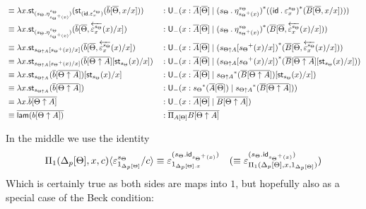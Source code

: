 \documentclass[10pt]{article}
\theoremstyle{definition}
\newcommand{\rewrite}[2]{\overleftarrow{#1}(#2)}
\newcommand\U[3]{\ensuremath{\mathsf{U}_{#1}(#2 \mid #3)}}
\newcommand\UI[2]{\ensuremath{\lambda #1.#2}}
\newcommand\St[2]{\ensuremath{{#1}^*(#2)}}
\newcommand\StI[2]{\ensuremath{\mathsf{st}_{#1}(#2)}}
\newcommand\TrPlus[2]{\ensuremath{{#1}^+(#2)}}
\newcommand{\id}{\mathsf{id}}
\newcommand\ap[2]{\ensuremath{#1 \langle #2 \rangle }}
\newcommand\bdot[0]{\mathbin{.}}
\begin{document}
\begin{enumerate}[style = multiline, labelwidth = 80pt]
\begin{align*}
&\equiv \UI{x}{\StI{(s_{\Theta} \bdot \eta^{s_\Theta}_{\TrPlus{s_\Theta}{x}})}{\StI{(\id \bdot \varepsilon^{s_\Theta}_x)}{\upstairs{b}[\upstairs{\Theta}, x/x]}}} && : \U{-}{x : \upstairs{A}[\upstairs{\Theta}]}{\St{(s_{\Theta} \bdot \eta^{s_\Theta}_{\TrPlus{s_\Theta}{x}})}{\St{(\id \bdot \varepsilon^{s_\Theta}_x)}{\upstairs{B}[\upstairs{\Theta}, x/x]}}} \\
&\equiv \UI{x}{\StI{(s_{\Theta} \bdot \eta^{s_\Theta}_{\TrPlus{s_\Theta}{x}})}{\upstairs{b}[\upstairs{\Theta}, \rewrite{\varepsilon^{s_\Theta}_x}{x}/x]}} && : \U{-}{x : \upstairs{A}[\upstairs{\Theta}]}{\St{(s_{\Theta} \bdot \eta^{s_\Theta}_{\TrPlus{s_\Theta}{x}})}{\upstairs{B}[\upstairs{\Theta}, \rewrite{\varepsilon^{s_\Theta}_x}{x}/x]}} \\
&\equiv \UI{x}{\StI{s_{\Theta \uparrow A}[\TrPlus{s_\Theta}{x}/x]}{\upstairs{b}[\upstairs{\Theta}, \rewrite{\varepsilon^{s_\Theta}_x}{x}/x]}} && : \U{-}{x : \upstairs{A}[\upstairs{\Theta}]}{\St{(s_{\Theta \uparrow A}[\TrPlus{s_\Theta}{x}/x])}{\upstairs{B}[\upstairs{\Theta}, \rewrite{\varepsilon^{s_\Theta}_x}{x}/x]}} \\
&\equiv \UI{x}{\StI{s_{\Theta \uparrow A}[\TrPlus{s_\Theta}{x}/x]}{\upstairs{b}[\upstairs{\Theta \uparrow A}][\StI{s_\Theta}{x}/x]}} && : \U{-}{x : \upstairs{A}[\upstairs{\Theta}]}{\St{(s_{\Theta \uparrow A}[\TrPlus{s_\Theta}{x}/x])}{\upstairs{B}[\upstairs{\Theta \uparrow A}][\StI{s_\Theta}{x}/x]}} \\
&\equiv \UI{x}{\StI{s_{\Theta \uparrow A}}{\upstairs{b}[\upstairs{\Theta \uparrow A}]}[\StI{s_\Theta}{x}/x]} && : \U{-}{x : \upstairs{A}[\upstairs{\Theta}]}{\St{s_{\Theta \uparrow A}}{\upstairs{B}[\upstairs{\Theta \uparrow A}]}[\StI{s_\Theta}{x}/x]} \\
&\equiv \UI{x}{\StI{s_{\Theta \uparrow A}}{\upstairs{b}[\upstairs{\Theta \uparrow A}]}} && : \U{-}{x : \St{s_\Theta}{\upstairs{A}[\upstairs{\Theta}]}}{\St{s_{\Theta \uparrow A}}{\upstairs{B}[\upstairs{\Theta \uparrow A}]}} \\
&\equiv \UI{x}{\upstairs{b[\Theta \uparrow A]}} && : \U{-}{x : \upstairs{A[\Theta]}}{\upstairs{B[\Theta \uparrow A]}} \\
&\equiv \upstairs{\mathsf{lam}(b[\Theta \uparrow A])} && : \upstairs{\Pi_{A[\Theta]} B[\Theta \uparrow A]}
\end{align*}

In the middle we use the identity
\begin{align*}
\ap{\Pi_1(\asdep{\Delta}[\Theta],x,c)}{\varepsilon^{s_\Theta}_{1_{\asdep{\Delta}[\Theta]}}/c} \equiv \varepsilon^{(s_{\Theta} \bdot \id_{\TrPlus{s_\Theta}{x}})}_{1_{\asdep{\Delta}[\Theta].x}} && (\equiv \varepsilon^{(s_{\Theta} \bdot \id_{\TrPlus{s_\Theta}{x}})}_{\Pi_1(\asdep{\Delta}[\Theta],x,1_{\asdep{\Delta}[\Theta]})})
\end{align*}
Which is certainly true as both sides are maps into $1$, but hopefully also as a special case of the Beck condition: 
\end{enumerate}
\end{document}
